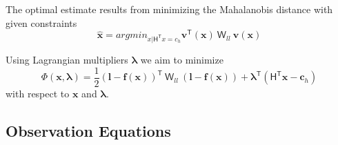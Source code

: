 The optimal estimate results from minimizing the Mahalanobis distance with given constraints
\begin{equation}
\widehat{\boldsymbol x}=
argmin_{x|\mathsf{H^T}x=c_h}
\boldsymbol v^\mathsf{T}(\boldsymbol x)\:
\mathsf{W}_{ll}\:
\boldsymbol v(\boldsymbol x)
\end{equation}

Using Lagrangian multipliers $\boldsymbol \lambda$ we aim to minimize
\begin{equation}\label{eq:targetequation}
\Phi(\boldsymbol x,\boldsymbol \lambda)=
\dfrac{1}{2}
(\boldsymbol l-\boldsymbol f(\boldsymbol x))^\mathsf{T}\:
\mathsf{W}_{ll}\:
(\boldsymbol l-\boldsymbol f(\boldsymbol x))+
\boldsymbol \lambda^\mathsf{T}
(\mathsf{H^T}\boldsymbol x-\boldsymbol c_h)
\end{equation}
with respect to $\boldsymbol x$ and $\boldsymbol \lambda$.
%


\subsection{Observation Equations}
\label{subsec:ObsEqua}

